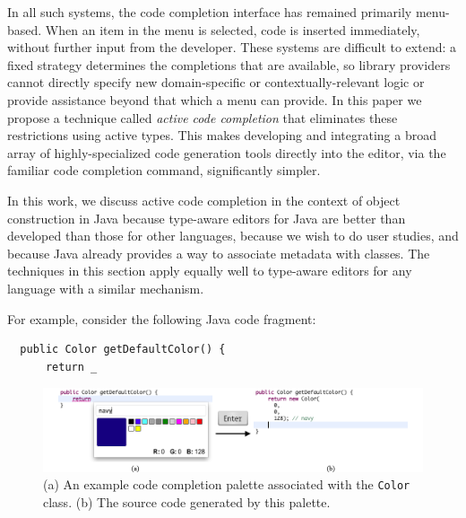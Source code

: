 In all such systems, the code completion interface has remained primarily menu-based. When an item in the menu is selected, code is inserted immediately, without further input from the developer. These systems are difficult to extend: a fixed strategy determines the completions that are available, so library providers cannot directly specify new domain-specific or contextually-relevant logic or provide assistance beyond that which a menu can provide. 
In this paper we propose a technique called {\it active code completion} that eliminates these restrictions using active types. This  makes developing and integrating a broad array of highly-specialized code generation tools directly into the editor, via the familiar code completion command, significantly simpler.%

In this work, we discuss active code completion in the context of object construction in Java because type-aware editors for Java are better than developed than those for other languages, because we wish to do user studies, and because Java already provides a way to associate metadata with classes. The techniques in this section apply equally well to type-aware editors for any language with a similar mechanism. 

For example, consider the following Java code fragment:

\begin{lstlisting}
  public Color getDefaultColor() {
      return _
\end{lstlisting}

\begin{figure}\label{color}
\begin{center}
\includegraphics[width=40pc]{color_palette.png}\end{center}
\caption{(a) An example code completion palette associated with the \texttt{Color} class. (b) The source code generated by this palette.}
\label{colorpalette}
\end{figure}

